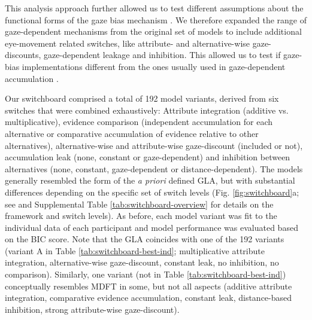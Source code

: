 \documentclass[11pt, a4paper]{article}
\begin{document}
This analysis approach further allowed us to test different assumptions about the functional forms of the gaze bias mechanism \parencite[e.g., as discounting non-ﬁxated alternatives’ values, controlling accumulation leak, among others; see][]{ashby2016FindingRightFit}. We therefore expanded the range of gaze-dependent mechanisms from the original set of models to include additional eye-movement related switches, like attribute- and alternative-wise gaze-discounts, gaze-dependent leakage and inhibition. This allowed us to test if gaze-bias implementations different from the ones usually used in gaze-dependent accumulation \parencite{fisher2017AttentionalDriftDiffusion,krajbich2010VisualFixationsComputation,krajbich2011MultialternativeDriftdiffusionModel,krajbich2012AttentionalDriftdiffusionModel,molter2019GLAMboxPythonToolbox,thomas2019GazeBiasDifferences,smith2018AttentionChoiceDomains,tavares2017AttentionalDriftDiffusion}.

Our switchboard comprised a total of 192 model variants, derived from six switches that were combined exhaustively: Attribute integration (additive vs. multiplicative), evidence comparison (independent accumulation for each alternative or comparative accumulation of evidence relative to other alternatives), alternative-wise and attribute-wise gaze-discount (included or not), accumulation leak (none, constant or gaze-dependent) and inhibition between alternatives (none, constant, gaze-dependent or distance-dependent). The models generally resembled the form of the \emph{a priori} defined GLA, but with substantial differences depending on the specific set of switch levels (Fig. \ref{fig:switchboard}a; see  and Supplemental Table \ref{tab:switchboard-overview} for details on the framework and switch levels). As before, each model variant was fit to the individual data of each participant and model performance was evaluated based on the BIC score. Note that the GLA coincides with one of the 192 variants (variant A in Table \ref{tab:switchboard-best-ind}; multiplicative attribute integration, alternative-wise gaze-discount, constant leak, no inhibition, no comparison). Similarly, one variant (not in Table \ref{tab:switchboard-best-ind}) conceptually resembles MDFT in some, but not all aspects (additive attribute integration, comparative evidence accumulation, constant leak, distance-based inhibition, strong attribute-wise gaze-discount).
\end{document}
